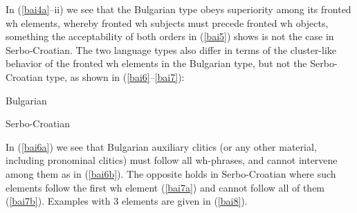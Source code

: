 \documentclass[output=paper]{langscibook}
\begin{document}
In (\ref{bai4a}--ii) we see that the Bulgarian type obeys superiority among its fronted wh elements, whereby fronted wh subjects must precede fronted wh objects, something the acceptability of both orders in (\ref{bai5}) shows is not the case in Serbo-Croatian. The two language types also differ in terms of the cluster-like behavior of the fronted wh elements in the Bulgarian type, but not the Serbo-Croatian type, as shown in (\ref{bai6}--\ref{bai7}):

\begin{exe}
\ex Bulgarian\label{bai6}
\begin{xlist}

\end{xlist}
\end{exe}

\begin{exe}
\ex Serbo-Croatian\label{bai7}
\begin{xlist}

\end{xlist}
\end{exe}

In (\ref{bai6a}) we see that Bulgarian auxiliary clitics (or any other material, including pronominal clitics) must follow all wh-phrases, and cannot intervene among them as in (\ref{bai6b}). The opposite holds in Serbo-Croatian where such elements follow the first wh element (\ref{bai7a}) and cannot follow all of them (\ref{bai7b}). Examples with 3 elements are given in (\ref{bai8}).

\begin{exe}
\ex \label{bai8}
\begin{xlist}
\end{xlist}
\end{exe}
\end{document}
